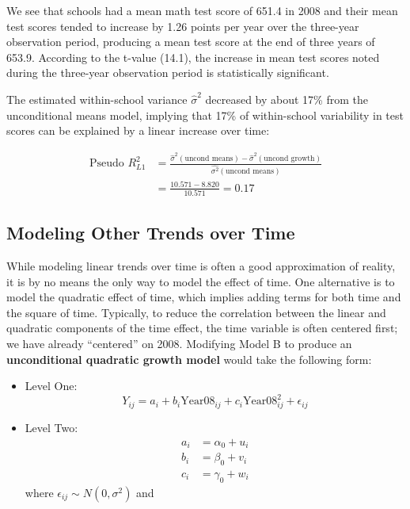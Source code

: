 \documentclass[
]{krantz}
\begin{document}
We see that schools had a mean math test score of 651.4 in 2008 and their mean test scores tended to increase by 1.26 points per year over the three-year observation period, producing a mean test score at the end of three years of 653.9. According to the t-value (14.1), the increase in mean test scores noted during the three-year observation period is statistically significant.

The estimated within-school variance \(\hat{\sigma}^2\) decreased by about 17\% from the unconditional means model, implying that 17\% of within-school variability in test scores can be explained by a linear increase over time:

\begin{align*}
\textrm{Pseudo }R^2_{L1} & = \frac{\hat{\sigma}^2(\textrm{uncond means}) - \hat{\sigma}^2(\textrm{uncond growth})}{\hat{\sigma^2}(\textrm{uncond means})} \\
 & = \frac{10.571-8.820}{10.571}= 0.17
\end{align*}

\subsection{Modeling Other Trends over Time}\label{othertimetrends}

While modeling linear trends over time is often a good approximation of reality, it is by no means the only way to model the effect of time. One alternative is to model the quadratic effect of time, which implies adding terms for both time and the square of time. Typically, to reduce the correlation between the linear and quadratic components of the time effect, the time variable is often centered first; we have already ``centered'' on 2008. Modifying Model B to produce an \textbf{unconditional quadratic growth model} would take the following form:

\begin{itemize}
\item
  Level One:
  \begin{equation*}
  Y_{ij}=a_{i}+b_{i}\textrm{Year08}_{ij}+c_{i}\textrm{Year08}^{2}_{ij} + \epsilon_{ij}
  \end{equation*}
\item
  Level Two:
  \begin{align*}
  a_{i} & = \alpha_{0} + u_{i}\\
  b_{i} & = \beta_{0} + v_{i}\\
  c_{i} & = \gamma_{0} + w_{i}
  \end{align*}
  where \(\epsilon_{ij}\sim N(0,\sigma^2)\) and
\end{itemize}
\end{document}

